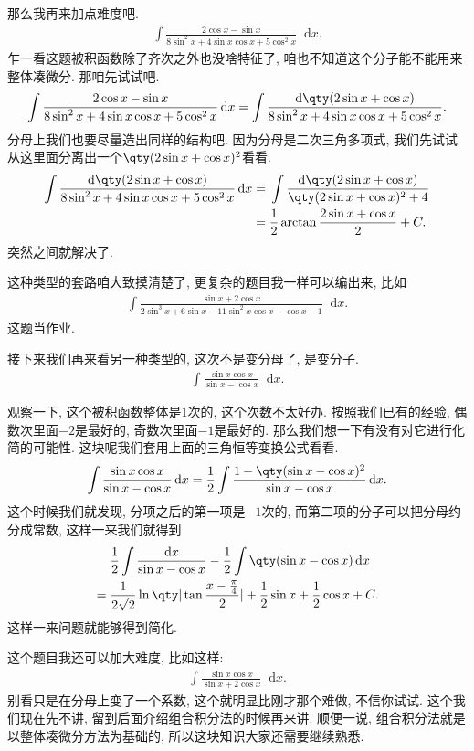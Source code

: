 \documentclass{ctexbook}
\newcommand*{\dif}{\mathop{}\!\mathrm{d}}
\begin{document}
{那么我再来加点难度吧. 
\begin{align*}
\int\frac{2\cos{x}-\sin{x}}{8\sin^{2}{x}+4\sin{x}\cos{x}+5\cos^{2}{x}}\dif{x}
.\end{align*}
乍一看这题被积函数除了齐次之外也没啥特征了, 咱也不知道这个分子能不能用来整体凑微分. 那咱先试试吧. 
\begin{align*}
\int\frac{2\cos{x}-\sin{x}}{8\sin^{2}{x}+4\sin{x}\cos{x}+5\cos^{2}{x}}\dif{x}=\int\frac{\dif{\qty(2\sin{x}+\cos{x})}}{8\sin^{2}{x}+4\sin{x}\cos{x}+5\cos^{2}{x}}
.\end{align*}
分母上我们也要尽量造出同样的结构吧. 因为分母是二次三角多项式, 我们先试试从这里面分离出一个$\qty(2\sin{x}+\cos{x})^{2}$看看. 
\begin{align*}
\int\frac{\dif{\qty(2\sin{x}+\cos{x})}}{8\sin^{2}{x}+4\sin{x}\cos{x}+5\cos^{2}{x}}\dif{x}={}&\int\frac{\dif{\qty(2\sin{x}+\cos{x})}}{\qty(2\sin{x}+\cos{x})^{2}+4}\\
={}&\frac{1}{2}\arctan{\frac{2\sin{x}+\cos{x}}{2}}+C
.\end{align*}
突然之间就解决了. \par
这种类型的套路咱大致摸清楚了, 更复杂的题目我一样可以编出来, 比如
\begin{align*}
\int\frac{\sin{x}+2\cos{x}}{2\sin^{3}{x}+6\sin{x}-11\sin^{2}{x}\cos{x}-\cos{x}-1}\dif{x}
.\end{align*}
这题当作业. \par
接下来我们再来看另一种类型的, 这次不是变分母了, 是变分子. 
\begin{align*}
\int\frac{\sin{x}\cos{x}}{\sin{x}-\cos{x}}\dif{x}
.\end{align*}\par
观察一下, 这个被积函数整体是$1$次的, 这个次数不太好办. 按照我们已有的经验, 偶数次里面$-2$是最好的, 奇数次里面$-1$是最好的. 那么我们想一下有没有对它进行化简的可能性. 这块呢我们套用上面的三角恒等变换公式看看. 
\begin{align*}
\int\frac{\sin{x}\cos{x}}{\sin{x}-\cos{x}}\dif{x}=\frac{1}{2}\int\frac{1-\qty(\sin{x}-\cos{x})^{2}}{\sin{x}-\cos{x}}\dif{x}
.\end{align*}
这个时候我们就发现, 分项之后的第一项是$-1$次的, 而第二项的分子可以把分母约分成常数, 这样一来我们就得到
\begin{align*}
{}&\frac{1}{2}\int\frac{\dif{x}}{\sin{x}-\cos{x}}-\frac{1}{2}\int\qty(\sin{x}-\cos{x})\dif{x}\\
={}&\frac{1}{2\sqrt{2}}\ln\qty|\tan{\frac{x-\frac{\pi}{4}}{2}}|+\frac{1}{2}\sin{x}+\frac{1}{2}\cos{x}+C
.\end{align*}
这样一来问题就能够得到简化. \par
这个题目我还可以加大难度, 比如这样: 
\begin{align*}
\int\frac{\sin{x}\cos{x}}{\sin{x}+2\cos{x}}\dif{x}
.\end{align*}
别看只是在分母上变了一个系数, 这个就明显比刚才那个难做, 不信你试试. 这个我们现在先不讲, 留到后面介绍组合积分法的时候再来讲. 顺便一说, 组合积分法就是以整体凑微分方法为基础的, 所以这块知识大家还需要继续熟悉. \par
}
\end{document}
